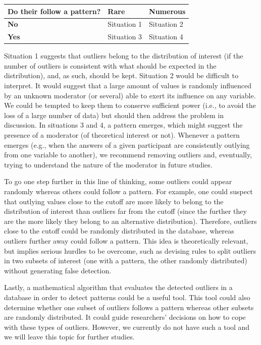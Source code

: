 \documentclass[man,floatsintext]{apa6}
\begin{document}
\begin{longtable}[]{@{}lll@{}}
\toprule
\textbf{Do their follow a pattern?} & Rare & Numerous\tabularnewline
\midrule
\endhead
\textbf{No} & Situation 1 & Situation 2\tabularnewline
\textbf{Yes} & Situation 3 & Situation 4\tabularnewline
\bottomrule
\end{longtable}

Situation 1 suggests that outliers belong to the distribution of interest (if the number of outliers is consistent with what should be expected in the distribution), and, as such, should be kept. Situation 2 would be difficult to interpret. It would suggest that a large amount of values is randomly influenced by an unknown moderator (or several) able to exert its influence on any variable. We could be tempted to keep them to conserve sufficient power (i.e., to avoid the loss of a large number of data) but should then address the problem in discussion. In situations 3 and 4, a pattern emerges, which might suggest the presence of a moderator (of theoretical interest or not). Whenever a pattern emerges (e.g., when the answers of a given participant are consistently outlying from one variable to another), we recommend removing outliers and, eventually, trying to understand the nature of the moderator in future studies.

To go one step further in this line of thinking, some outliers could appear randomly whereas others could follow a pattern. For example, one could suspect that outlying values close to the cutoff are more likely to belong to the distribution of interest than outliers far from the cutoff (since the further they are the more likely they belong to an alternative distribution). Therefore, outliers close to the cutoff could be randomly distributed in the database, whereas outliers further away could follow a pattern. This idea is theoretically relevant, but implies serious hurdles to be overcome, such as devising rules to split outliers in two subsets of interest (one with a pattern, the other randomly distributed) without generating false detection.

Lastly, a mathematical algorithm that evaluates the detected outliers in a database in order to detect patterns could be a useful tool. This tool could also determine whether one subset of outliers follows a pattern whereas other subsets are randomly distributed. It could guide researchers' decisions on how to cope with these types of outliers. However, we currently do not have such a tool and we will leave this topic for further studies.
\end{document}
